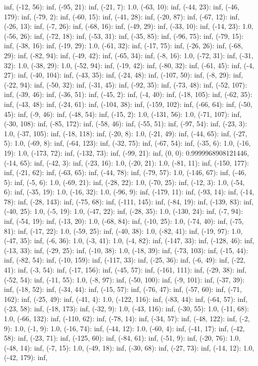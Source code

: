 \documentclass[parskip=half]{scrartcl}
\begin{document}
inf, (-12, 56): inf, (-95, 21): inf, (-21, 7): 1.0, (-63, 10): inf, (-44, 23): inf, (-46, 179): inf, (-79, 2): inf, (-60, 15): inf, (-41, 28): inf, (-20, 87): inf, (-67, 12): inf, (-26, 13): inf, (-7, 26): inf, (-68, 16): inf, (-49, 29): inf, (-33, 10): inf, (-14, 23): 1.0, (-56, 26): inf, (-72, 18): inf, (-53, 31): inf, (-35, 85): inf, (-96, 75): inf, (-79, 15): inf, (-38, 16): inf, (-19, 29): 1.0, (-61, 32): inf, (-17, 75): inf, (-26, 26): inf, (-68, 29): inf, (-82, 94): inf, (-49, 42): inf, (-65, 34): inf, (-8, 16): 1.0, (-72, 31): inf, (-31, 32): 1.0, (-38, 29): 1.0, (-52, 94): inf, (-19, 42): inf, (-80, 32): inf, (-61, 45): inf, (-4, 27): inf, (-40, 104): inf, (-43, 35): inf, (-24, 48): inf, (-107, 50): inf, (-8, 29): inf, (-22, 94): inf, (-50, 32): inf, (-31, 45): inf, (-92, 35): inf, (-73, 48): inf, (-52, 107): inf, (-39, 46): inf, (-36, 51): inf, (-45, 2): inf, (-4, 40): inf, (-18, 105): inf, (-62, 35): inf, (-43, 48): inf, (-24, 61): inf, (-104, 38): inf, (-159, 102): inf, (-66, 64): inf, (-50, 45): inf, (-9, 46): inf, (-48, 54): inf, (-15, 2): 1.0, (-131, 56): 1.0, (-71, 107): inf, (-30, 108): inf, (-85, 172): inf, (-58, 46): inf, (-55, 51): inf, (-97, 54): inf, (-23, 3): 1.0, (-37, 105): inf, (-18, 118): inf, (-20, 8): 1.0, (-21, 49): inf, (-44, 65): inf, (-27, 5): 1.0, (-69, 8): inf, (-64, 123): inf, (-32, 75): inf, (-67, 54): inf, (-35, 6): 1.0, (-16, 19): 1.0, (-173, 72): inf, (-132, 73): inf, (-99, 21): inf, (0, 0): 0.9999968908121446, (-14, 65): inf, (-42, 3): inf, (-23, 16): 1.0, (-20, 21): 1.0, (-81, 11): inf, (-150, 177): inf, (-21, 62): inf, (-63, 65): inf, (-44, 78): inf, (-79, 57): 1.0, (-146, 67): inf, (-46, 5): inf, (-5, 6): 1.0, (-69, 21): inf, (-28, 22): 1.0, (-70, 25): inf, (-12, 3): 1.0, (-54, 6): inf, (-35, 19): 1.0, (-16, 32): 1.0, (-96, 9): inf, (-179, 11): inf, (-93, 14): inf, (-14, 78): inf, (-28, 143): inf, (-75, 68): inf, (-111, 145): inf, (-84, 19): inf, (-139, 83): inf, (-40, 25): 1.0, (-5, 19): 1.0, (-47, 22): inf, (-28, 35): 1.0, (-130, 24): inf, (-7, 94): inf, (-54, 19): inf, (-13, 20): 1.0, (-68, 84): inf, (-10, 25): 1.0, (-74, 40): inf, (-75, 81): inf, (-17, 22): 1.0, (-59, 25): inf, (-40, 38): 1.0, (-82, 41): inf, (-19, 97): 1.0, (-47, 35): inf, (-6, 36): 1.0, (-3, 41): 1.0, (-4, 82): inf, (-147, 33): inf, (-128, 46): inf, (-13, 33): inf, (-29, 25): inf, (-10, 38): 1.0, (-18, 39): inf, (-73, 103): inf, (-15, 44): inf, (-82, 54): inf, (-10, 159): inf, (-117, 33): inf, (-25, 36): inf, (-6, 49): inf, (-22, 41): inf, (-3, 54): inf, (-17, 156): inf, (-45, 57): inf, (-161, 111): inf, (-29, 38): inf, (-52, 54): inf, (-11, 55): 1.0, (-8, 97): inf, (-50, 100): inf, (-9, 101): inf, (-37, 39): inf, (-18, 52): inf, (-34, 44): inf, (-15, 57): inf, (-76, 47): inf, (-57, 60): inf, (-71, 162): inf, (-25, 49): inf, (-41, 4): 1.0, (-122, 116): inf, (-83, 44): inf, (-64, 57): inf, (-23, 58): inf, (-18, 173): inf, (-32, 9): 1.0, (-43, 116): inf, (-30, 55): 1.0, (-11, 68): 1.0, (-66, 132): inf, (-110, 62): inf, (-78, 14): inf, (-34, 57): inf, (-48, 122): inf, (-2, 9): 1.0, (-1, 9): 1.0, (-16, 74): inf, (-44, 12): 1.0, (-60, 4): inf, (-41, 17): inf, (-42, 58): inf, (-23, 71): inf, (-125, 60): inf, (-84, 61): inf, (-51, 9): inf, (-20, 76): 1.0, (-48, 14): inf, (-7, 15): 1.0, (-49, 18): inf, (-30, 68): inf, (-27, 73): inf, (-14, 12): 1.0, (-42, 179): inf, 
\end{document}
